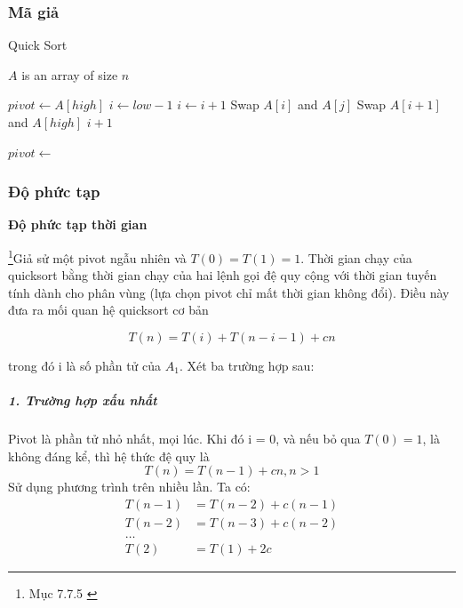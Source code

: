 \subsubsection{Mã giả}
 
\begin{algorithm}[H]
\caption{Quick Sort}
\label{alg:quick-sort}
\begin{algorithmic}

\Require $A$ is an array of size $n$

\State $pivot \gets A[high]$
\State $i \gets low - 1$
        \State $i \gets i + 1$
        \State Swap $A[i]$ and $A[j]$
    \EndIf
\EndFor
\State Swap $A[i+1]$ and $A[high]$
\State \Return $i+1$
\EndFunction

    \State $pivot \gets$  \State
     
    \State {} 
\EndIf
\EndFunction

\end{algorithmic}
\end{algorithm}


\subsubsection{Độ phức tạp}
\textbf{Độ phức tạp thời gian}

\footnote{Mục 7.7.5 \cite{dsa-analysis-cpp}}Giả sử một pivot ngẫu nhiên và $T(0) = T(1) = 1$. Thời gian chạy của quicksort bằng thời gian chạy của hai lệnh gọi đệ quy cộng với thời gian tuyến tính dành cho phân vùng (lựa chọn pivot chỉ mất thời gian không đổi). Điều này đưa ra mối quan hệ quicksort cơ bản 

\begin{equation}
T(n) = T(i) + T(n - i - 1) + cn \tag{2.8.1} 
\end{equation}

trong đó i là số phần tử của $A_1$. Xét ba trường hợp sau:

\subparagraph{1. Trường hợp xấu nhất}

Pivot là phần tử nhỏ nhất, mọi lúc. Khi đó i = 0, và nếu bỏ qua $ T(0) = 1$, là không đáng kể, thì hệ thức đệ quy là 
$$T(n) = T(n - 1) + cn,  n > 1$$ 								 
Sử dụng phương trình trên nhiều lần. Ta có:
\begin{align*}
T(n - 1) &= T(n - 2) + c(n - 1) \\
T(n - 2) &= T(n - 3) + c(n - 2) \\
\dots \\
T(2) &= T(1) + 2c   
\end{align*}
	 
